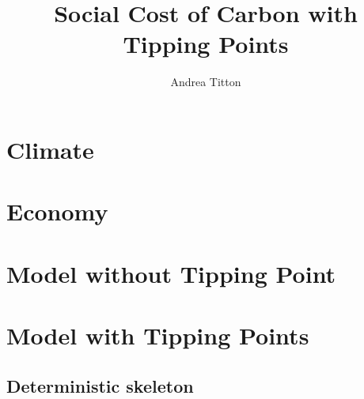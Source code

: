 \documentclass[american, abstract=on]{scrartcl}
\author{Andrea Titton}
\title{Social Cost of Carbon with Tipping Points}
\begin{document}
\maketitle


\section{Climate}



\section{Economy}



\section{Model without Tipping Point}



\section{Model with Tipping Points}

\subsection{Deterministic skeleton}


\nocite{*}
\newpage
\printbibliography
\end{document}
